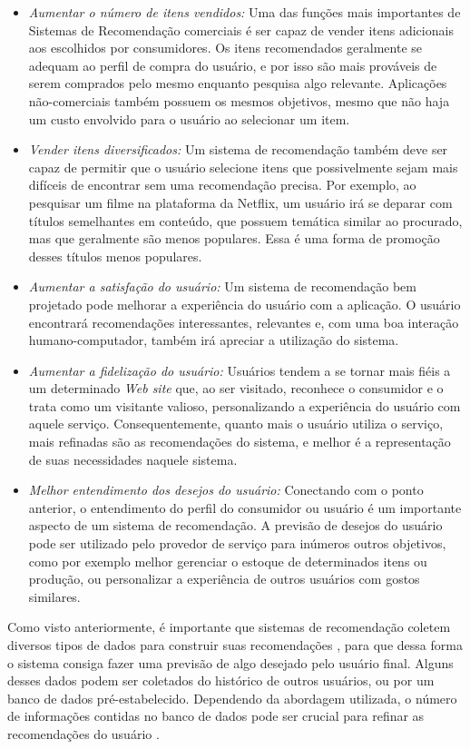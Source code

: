 \documentclass[
	12pt,				%
	a4paper,			%
	english,			%
	french,				%
	spanish,			%
	brazil				%
	]{abntex2}
\begin{document}
\begin{itemize}
    \item \emph{Aumentar o número de itens vendidos:} Uma das funções mais importantes de Sistemas de Recomendação comerciais é ser capaz de vender itens adicionais aos escolhidos por consumidores. Os itens recomendados geralmente se adequam ao perfil de compra do usuário, e por isso são mais prováveis de serem comprados pelo mesmo enquanto pesquisa algo relevante. Aplicações não-comerciais também possuem os mesmos objetivos, mesmo que não haja um custo envolvido para o usuário ao selecionar um item.
    \item \emph{Vender itens diversificados:} Um sistema de recomendação também deve ser capaz de permitir que o usuário selecione itens que possivelmente sejam mais difíceis de encontrar sem uma recomendação precisa. Por exemplo, ao pesquisar um filme na plataforma da Netflix, um usuário irá se deparar com títulos semelhantes em conteúdo, que possuem temática similar ao procurado, mas que geralmente são menos populares. Essa é uma forma de promoção desses títulos menos populares.
    \item \emph{Aumentar a satisfação do usuário:} Um sistema de recomendação bem projetado pode melhorar a experiência do usuário com a aplicação. O usuário encontrará recomendações interessantes, relevantes e, com uma boa interação humano-computador, também irá apreciar a utilização do sistema.
    \item \emph{Aumentar a fidelização do usuário:} Usuários tendem a se tornar mais fiéis a um determinado \emph{Web site} que, ao ser visitado, reconhece o consumidor e o trata como um visitante valioso, personalizando a experiência do usuário com aquele serviço. Consequentemente, quanto mais o usuário utiliza o serviço, mais refinadas são as recomendações do sistema, e melhor é a representação de suas necessidades naquele sistema.
    \item \emph{Melhor entendimento dos desejos do usuário:} Conectando com o ponto anterior, o entendimento do perfil do consumidor ou usuário é um importante aspecto de um sistema de recomendação. A previsão de desejos do usuário pode ser utilizado pelo provedor de serviço para inúmeros outros objetivos, como por exemplo melhor gerenciar o estoque de determinados itens ou produção, ou personalizar a experiência de outros usuários com gostos similares.
\end{itemize}

Como visto anteriormente, é importante que sistemas de recomendação coletem diversos tipos de dados para construir suas recomendações \cite{ricci2011introduction, herlocker2004evaluating}, para que dessa forma o sistema consiga fazer uma previsão de algo desejado pelo usuário final. Alguns desses dados podem ser coletados do histórico de outros usuários, ou por um banco de dados pré-estabelecido. Dependendo da abordagem utilizada, o número de informações contidas no banco de dados pode ser crucial para refinar as recomendações do usuário \cite{resnick1997recommender}.
\end{document}
